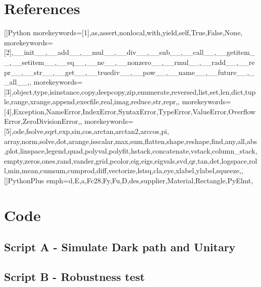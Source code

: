 \documentclass[a4paper, 12pt]{article}
\begin{document}
\newpage
\section*{References}


%
%
\newpage

\appendix

[]{Python}{
  morekeywords=[1]{,as,assert,nonlocal,with,yield,self,True,False,None,} %
  morekeywords=[2]{,__init__,__add__,__mul__,__div__,__sub__,__call__,__getitem__,__setitem__,__eq__,__ne__,__nonzero__,__rmul__,__radd__,__repr__,__str__,__get__,__truediv__,__pow__,__name__,__future__,__all__,}, %
  morekeywords=[3]{,object,type,isinstance,copy,deepcopy,zip,enumerate,reversed,list,set,len,dict,tuple,range,xrange,append,execfile,real,imag,reduce,str,repr,}, %
  morekeywords=[4]{,Exception,NameError,IndexError,SyntaxError,TypeError,ValueError,OverflowError,ZeroDivisionError,}, %
  morekeywords=[5]{,ode,fsolve,sqrt,exp,sin,cos,arctan,arctan2,arccos,pi, array,norm,solve,dot,arange,isscalar,max,sum,flatten,shape,reshape,find,any,all,abs,plot,linspace,legend,quad,polyval,polyfit,hstack,concatenate,vstack,column_stack,empty,zeros,ones,rand,vander,grid,pcolor,eig,eigs,eigvals,svd,qr,tan,det,logspace,roll,min,mean,cumsum,cumprod,diff,vectorize,lstsq,cla,eye,xlabel,ylabel,squeeze,}, %
}
[]{PythonPlus}{
  emph={d,E,a,Fc28,Fy,Fu,D,des,supplier,Material,Rectangle,PyElmt},
}


\section{Code}
\subsection{Script A - Simulate Dark path and Unitary}
\footnotesize


\subsection{Script B - Robustness test}
\footnotesize

\end{document}
